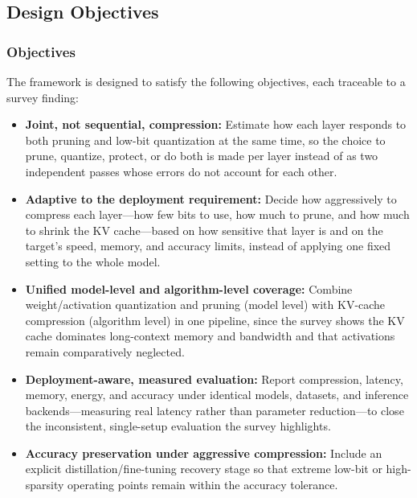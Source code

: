 \documentclass[
11pt, %
english, %
singlespacing, %
headsepline, %
]{MastersDoctoralThesis} %
\begin{document}
\subsection{Design Objectives}

\subsubsection{Objectives}

The framework is designed to satisfy the following objectives, each traceable to a survey finding:

\begin{itemize}

  \item \textbf{Joint, not sequential, compression:} Estimate how each layer responds to both pruning and low-bit quantization at the same time, so the choice to prune, quantize, protect, or do both is made per layer instead of as two independent passes whose errors do not account for each other.

  \item \textbf{Adaptive to the deployment requirement:} Decide how aggressively to compress each layer---how few bits to use, how much to prune, and how much to shrink the KV cache---based on how sensitive that layer is and on the target's speed, memory, and accuracy limits, instead of applying one fixed setting to the whole model.

  \item \textbf{Unified model-level and algorithm-level coverage:} Combine weight/activation quantization and pruning (model level) with KV-cache compression (algorithm level) in one pipeline, since the survey shows the KV cache dominates long-context memory and bandwidth and that activations remain comparatively neglected.

  \item \textbf{Deployment-aware, measured evaluation:} Report compression, latency, memory, energy, and accuracy under identical models, datasets, and inference backends---measuring real latency rather than parameter reduction---to close the inconsistent, single-setup evaluation the survey highlights.

  \item \textbf{Accuracy preservation under aggressive compression:} Include an explicit distillation/fine-tuning recovery stage so that extreme low-bit or high-sparsity operating points remain within the accuracy tolerance.

\end{itemize}
\end{document}
